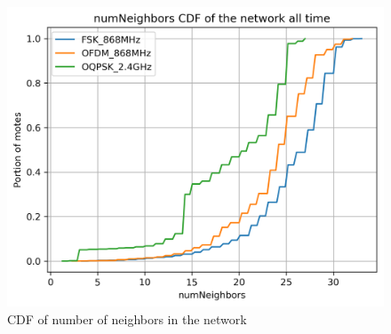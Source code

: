 \documentclass[journal]{IEEEtran}
\begin{document}
\begin{figure}
	\centering
	\includegraphics[width=0.90\columnwidth]{numNeighbors_cdf_plot_full}
	\caption{CDF of number of neighbors in the network} 
    \label{fig:numNeighbors_cdf_plot_full}
\end{figure}
\end{document}
